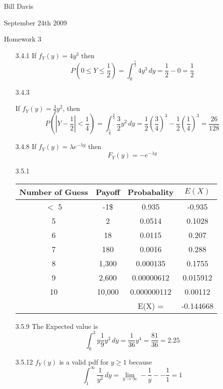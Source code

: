 \documentclass[11pt,fleqn]{article}
\begin{document}
\newcommand{\mbf}[1]{\mbox{{\bfseries #1}}}
\newcommand{\N}{\mbf{N}}
\renewcommand{\O}{\mbf{O}}
\newcommand{\tabfrac}[2]{%
	\setlength{\fboxrule}{0pt}%
	\fbox{$\frac{#1}{#2}$}%
}

\noindent Bill Davis 

\noindent September 24th 2009 

\noindent Homework 3

\begin{enumerate} 

\item[3.4.1]
If $f_{Y}(y) = 4y^3$ then 
\[
P(0 \leq Y \leq \frac{1}{2}) = \int_0^{\frac{1}{2}}4y^3 \,dy = \frac{1}{2}-0 =
\frac{1}{2}
\]

\item[3.4.3]

If $f_{Y}(y) = \frac{3}{2}y^2$, then 
\[
P(| Y-\frac{1}{2} | < \frac{1}{4}) = \int_{\frac{1}{4}}^{\frac{3}{4}}
\frac{3}{2}y^2  \,dy = \frac{1}{2}(\frac{3}{4})^3-\frac{1}{2}(\frac{1}{4})^3 =
\frac{26}{128}
\]

\item[3.4.8]
If $f_Y(y)=\lambda e^{-\lambda y}$ then
\[
F_{Y}(y) = -e^{-\lambda y}
\]

\item[3.5.1]

\begin{tabular}{c c c | c}
\hline
Number of Guess & Payoff & Probabality & $E(X)$ \\
\hline
$<$ 5 & -1\$ & 0.935 & -0.935\\
5 & 2 & 0.0514 & 0.1028 \\
6 & 18 & 0.0115 & 0.207 \\
7 & 180 & 0.0016 & 0.288 \\
8 & 1,300 & 0.000135 & 0.1755 \\
9 & 2,600 & 0.00000612 & 0.015912 \\
10 & 10,000 & 0.000000112 & 0.00112 \\
\hline 
 & & E(X) = & -0.144668 \\

\end{tabular}

\item[3.5.9]
The Expected value is 
\[
\int_0^3 y\frac{1}{9}y^2 \,dy = \frac{1}{36}y^4 = \frac{81}{36} = 2.25
\]
\item[3.5.12]
$f_{Y}(y)$ is a valid pdf for $y \geq 1$ because 
\[
\int_1^\infty \frac{1}{y^2} \,dy = \lim_{y\to\infty}-\frac{1}{y} - -\frac{1}{1}
= 1
\]


\end{enumerate}
\end{document}
